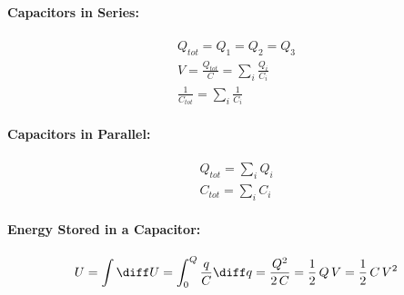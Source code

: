 	\begin{multicols*}{2}
		\paragraph{Capacitors in Series:} %
		
			\begin{gather*}
				Q_{tot} = Q_1 = Q_2 = Q_3 \\
				V = \frac{Q_{tot}}{C} = \sum_i \frac{Q_i}{C_i} \\
				\frac{1}{C_{tot}} = \sum_i \frac{1}{C_i}
			\end{gather*}

		
		
		\paragraph{Capacitors in Parallel:} %
			\begin{gather*}
				Q_{tot} = \sum_i Q_i \\
				C_{tot} = \sum_i C_i
			\end{gather*}
			
	\end{multicols*}
	
	\paragraph{Energy Stored in a Capacitor:} %
		\[
			U = \int \diff U = \int_0^Q \frac{q}{C} \diff q = \frac{Q^2}{2\,C} = \frac{1}{2} \,Q\,V = \frac{1}{2}\,C\,V^2
		\]
	
